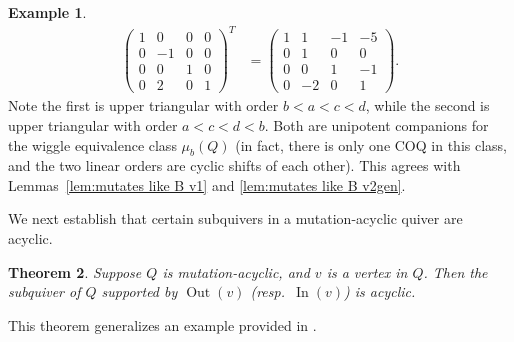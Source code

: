 \documentclass[11pt, letterpaper]{amsart}
\newtheorem{theorem}{Theorem}[section]
\theoremstyle{definition}
\newtheorem{example}[theorem]{Example}
\numberwithin{equation}{section}
\def\In{{\operatorname{In}}}
\def\Out{{\operatorname{Out}}}
\begin{document}
{\begin{example}
\begin{align*}
\begin{pmatrix}
1 & 0 & 0 & 0 \\
0 & -1 & 0 & 0 \\
0 & 0 & 1 & 0 \\
0 & 2 & 0 & 1
\end{pmatrix}^T
&= \begin{pmatrix}
1 & 1 & -1 & -5 \\
0 & 1 & 0 & 0 \\
0 & 0 & 1 & -1 \\
0 & -2 & 0 & 1
\end{pmatrix}.
\end{align*}
Note the first is upper triangular with order $b < a < c < d$, while the second is upper triangular with order $a < c < d < b$.
Both are unipotent companions for the wiggle equivalence class $\mu_b(Q)$ (in fact, there is only one COQ in this class, and the two linear orders are cyclic shifts of each other).
This agrees with Lemmas~\ref{lem:mutates like B v1} and \ref{lem:mutates like B v2gen}.
\end{example}
} %

\pagebreak[3]

We next establish that certain subquivers in a mutation-acyclic quiver are acyclic.

\begin{theorem}
\label{thm:no vortex}
Suppose $Q$ is mutation-acyclic, and $v$ is a vertex in $Q$.
Then the subquiver of $Q$ supported by $\Out(v)$ (resp.\ $\In(v)$) is acyclic.
\end{theorem}

This theorem generalizes an example provided in \cite[Figure 1]{SevenAMatrices}. 
\end{document}
